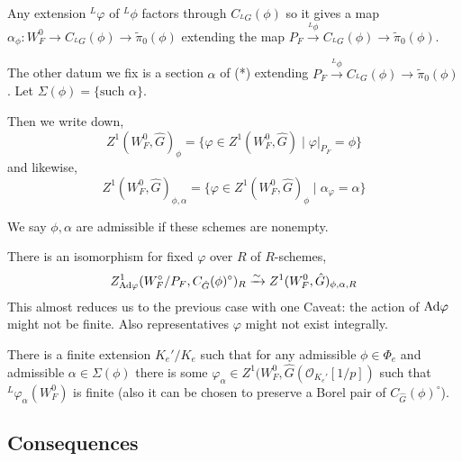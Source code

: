 \documentclass[12pt]{article}
\begin{document}
Any extension ${}^L \varphi$ of ${}^L \phi$ factors through $C_{{}^L G}(\phi)$ so it gives a map $\alpha_\phi : W_F^0 \to C_{{}^L G}(\phi) \to \tilde{\pi}_0(\phi)$ extending the map $P_F \xrightarrow{{}^L \phi} C_{{}^L G}(\phi) \to \tilde{\pi}_0(\phi)$. 
\begin{center}
The other datum we fix is a section $\alpha$ of (*) extending $P_F \xrightarrow{{}^L \phi} C_{{}^L G}(\phi) \to \tilde{\pi}_0(\phi)$. Let $\Sigma(\phi) = \{ \text{such } \alpha \}$. 
\end{center}

Then we write down,
\[ Z^1(W_F^0, \hat{G})_\phi = \{ \varphi \in Z^1(W_F^0, \hat{G}) \mid \varphi|_{P_F} = \phi \} \]
and likewise,
\[ Z^1(W_F^0, \hat{G})_{\phi, \alpha} = \{ \varphi \in Z^1(W_F^0, \hat{G})_{\phi} \mid \alpha_{\varphi} = \alpha \} \]

\begin{defn}
We say $\phi, \alpha$ are admissible if these schemes are nonempty.
\end{defn}

There is an isomorphism for fixed $\varphi$ over $R$ of $R$-schemes,
\[ Z^1_{\mathrm{Ad} \varphi}(W^\circ_F / P_F, C_{\hat{G}}(\phi)^\circ)_R \xrightarrow{\sim} Z^1(W_F^0, \hat{G})_{\phi, \alpha, R} \]
This almost reduces us to the previous case with one Caveat: the action of $\mathrm{Ad} \varphi$ might not be finite. Also representatives $\varphi$ might not exist integrally.

\begin{theorem}
There is a finite extension $K_e' / K_e$ such that for any admissible $\phi \in \Phi_e$ and admissible $\alpha \in \Sigma(\phi)$ there is some $\varphi_\alpha \in Z^1(W_F^0, \hat{G}(\mathcal{O}_{K_e'}[1/p])$ such that ${}^L \varphi_\alpha(W_F^0)$ is finite (also it can be chosen to preserve a Borel pair of $C_{\hat{G}}(\phi)^\circ$). 
\end{theorem}

\subsection{Consequences}
\end{document}
